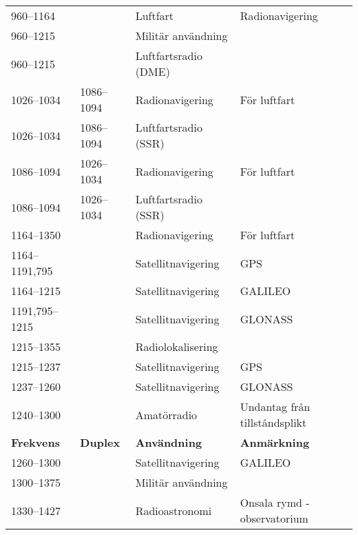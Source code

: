 \begin{landscape}
\begin{longtable}{llll}
	960--1164          &                    & Luftfart                & Radionavigering                          \\
	960--1215          &                    & Militär användning      &  \\
	960--1215          &                    & Luftfartsradio (DME)    &  \\
	1026--1034         & 1086--1094         & Radionavigering         & För luftfart                             \\
	1026--1034         & 1086--1094         & Luftfartsradio (SSR)    &  \\
	1086--1094         & 1026--1034         & Radionavigering         & För luftfart                             \\
	1086--1094         & 1026--1034         & Luftfartsradio (SSR)    &  \\
	1164--1350         &                    & Radionavigering         & För luftfart                             \\
	1164--1191,795     &                    & Satellitnavigering      & GPS                                      \\
	1164--1215         &                    & Satellitnavigering      & GALILEO                                  \\
	1191,795--1215     &                    & Satellitnavigering      & GLONASS                                  \\
	1215--1355         &                    & Radiolokalisering       &  \\
	1215--1237         &                    & Satellitnavigering      & GPS                                      \\
	1237--1260         &                    & Satellitnavigering      & GLONASS                                  \\
	1240--1300         &                    & Amatörradio             & Undantag från tillståndsplikt            \\
	\textbf{Frekvens}  & \textbf{Duplex}    & \textbf{Användning}     & \textbf{Anmärkning}                      \\ \hline
	1260--1300         &                    & Satellitnavigering      & GALILEO                                  \\
	1300--1375         &                    & Militär användning      &  \\
	1330--1427         &                    & Radioastronomi          & Onsala rymd - observatorium              \\

\end{longtable}
\end{landscape}
